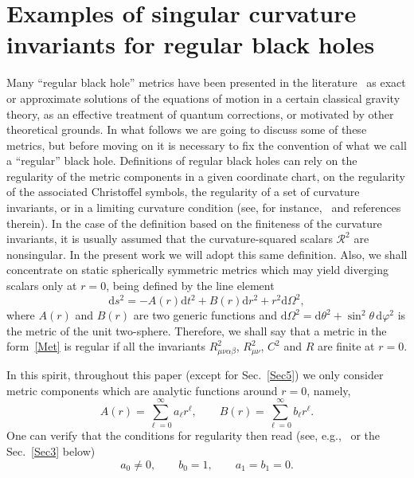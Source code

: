 \documentclass[aps,prd,a4paper,twocolumn,showpacs,showkeys,preprintnumbers,amsmath,amssymb,nofootinbib,usenames,dvipsnames]{revtex4-2}
\newcommand{\be}{\begin{eqnarray}}
\def\beq{\begin{equation}}
\def\eeq{\end{equation}}
\newcommand{\rd}{\mathrm{d}}  %
\newcommand{\n}[1]{\label{#1}}
\def\al{\alpha}
\def\be{\beta}
\def\th{\theta}
\def\ph{\varphi}
\begin{document}

\section{Examples of singular curvature invariants for regular black holes}
\label{Sec2}

Many ``regular black hole'' metrics have been presented in the literature~\cite{Newton-MNS,Newton-BLG,BreTib2,BreTib1,Nos6der,Frolov:2016pav,Berry:2021hos,Bardeen,AyonBeato:1998ub,Dymnikova:2004zc,Nicolini:2005vd,Bronnikov:2005gm,Simpson:2018tsi,Accioly:2016qeb,Boos:2021kqe,Cano:2020ezi,Cano:2020qhy,Baake:2021jzv,Zhang14,Tseytlin:1995uq,Frolov:Exp,Frolov:Poly,Head-On,Buoninfante:2018rlq,Nicolini:2019irw,Nicolini:2012eu,Bonanno:2000ep,Hayward,Dymnikova:1992ux,DeLorenzo:2014pta,AyonBeato:1999ec,AyonBeato:1999rg,Bronnikov:2000vy,Berej:2006cc,Balart:2014cga} as exact or approximate solutions of the equations of motion in a certain classical gravity theory, as an effective treatment of quantum corrections, or motivated by other theoretical grounds. In what follows we are going to discuss some of these metrics, but before moving on it is necessary to fix the convention of what we call a ``regular'' black hole. Definitions of regular black holes can rely on the regularity of the metric components in a given  coordinate chart, on the regularity of the associated Christoffel symbols, the regularity of a set of curvature invariants, or in a limiting curvature condition (see, for instance,~\cite{Frolov:2016pav,Berry:2021hos} and references therein). In the case of the definition based on the finiteness of the curvature invariants, it is usually assumed that the curvature-squared scalars $\mathcal{R}^2$ are nonsingular. In the present work we will adopt this same definition. 
Also, we shall concentrate on static spherically symmetric metrics which may yield diverging scalars only at $r=0$, being defined by the line element
%
\beq \label{Met}
\rd s^2 = - A(r) \rd t^2 + B(r) \rd r^2 + r^2 \rd \Omega^2,
\eeq
%
where $A(r)$ and $B(r)$ are two generic functions and $\rd\Omega^2 = \rd\th^2 + \sin^2 \th \, \rd \ph^2 $ is the metric of the unit two-sphere.
Therefore,
we shall say that a metric in the form~\eqref{Met} is regular if all the invariants $R_{\mu\nu\al\be}^2$, $R_{\mu\nu}^2$, $C^2$ and $R$ are finite at $r=0$.


In this spirit, throughout this paper (except for Sec.~\ref{Sec5}) we only consider metric components which are analytic functions around $r = 0$, namely,
\beq \label{SeriesAB-0}
A(r) = \sum_{\ell=0}^{\infty} a_\ell r^\ell  , \qquad
B(r) = \sum_{\ell=0}^{\infty} b_\ell r^\ell .
\eeq
One can verify that
the conditions for regularity then read (see, {e.g.},~\cite{Frolov:2016pav} or the Sec.~\ref{Sec3} below)
\beq
\n{rego}
a_0 \neq 0, \qquad b_0 = 1,
\qquad
a_1 = b_1 = 0.
\eeq
\end{document}
